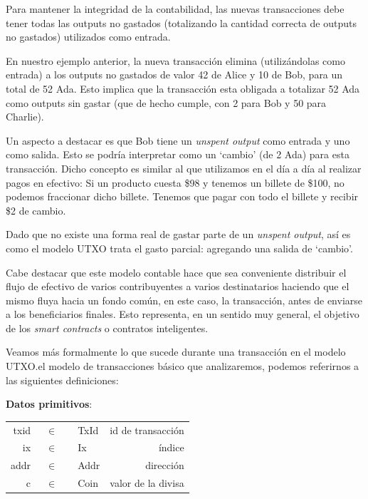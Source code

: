 \documentclass[12pt]{book}
\begin{document}
Para mantener la integridad de la contabilidad, las nuevas transacciones debe tener todas las outputs no gastados (totalizando la cantidad correcta de outputs no gastados) utilizados como entrada.

En nuestro ejemplo anterior, la nueva transacción elimina (utilizándolas como entrada) a los outputs no gastados de valor 42 de Alice y 10 de Bob, para un total de 52 Ada. Esto implica que la transacción esta obligada a totalizar 52 Ada como outputs sin gastar (que de hecho cumple, con 2 para Bob y 50 para Charlie).

Un aspecto a destacar es que Bob tiene un \textit{unspent output} como entrada y uno como salida. Esto se podría interpretar como un `cambio' (de 2 Ada) para esta transacción. Dicho concepto es similar al que utilizamos en el día a día al realizar pagos en efectivo: Si un producto cuesta \$98 y tenemos un billete de \$100, no podemos fraccionar dicho billete. Tenemos que pagar con todo el billete y recibir \$2 de cambio.

Dado que no existe una forma real de gastar parte de un \textit{unspent output}, así es como el modelo UTXO trata el gasto parcial: agregando una salida de `cambio'.

Cabe destacar que este modelo contable hace que sea conveniente distribuir el flujo de efectivo de varios contribuyentes a varios destinatarios haciendo que el mismo fluya hacia un fondo común, en este caso, la transacción, antes de enviarse a los beneficiarios finales. Esto representa, en un sentido muy general, el objetivo de los \textit{smart contracts} o contratos inteligentes.

Veamos más formalmente lo que sucede durante una transacción en el modelo UTXO.\@Para el modelo de transacciones básico que analizaremos, podemos referirnos a las siguientes definiciones:

\textbf{Datos primitivos}:

\begin{center}
	\begin{tabular}{ r @{} c @{} l r }
		txid & \ $\in$\ \  & TxId & id de transacción  \\
		ix   & \ $\in$\ \  & Ix   & índice             \\
		addr & \ $\in$\ \  & Addr & dirección          \\
		c    & \ $\in$\ \  & Coin & valor de la divisa \\
	\end{tabular}
\end{center}
\end{document}
